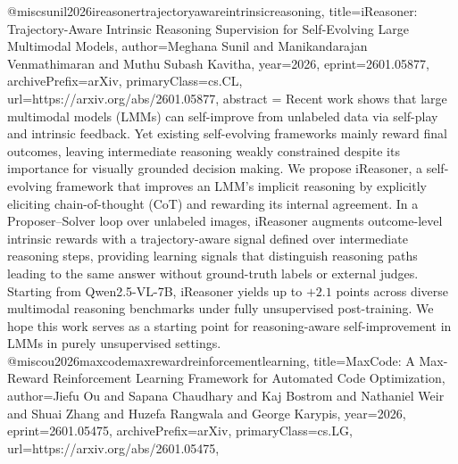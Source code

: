{}@misc{sunil2026ireasonertrajectoryawareintrinsicreasoning,
      title={iReasoner: Trajectory-Aware Intrinsic Reasoning Supervision for Self-Evolving Large Multimodal Models}, 
      author={Meghana Sunil and Manikandarajan Venmathimaran and Muthu Subash Kavitha},
      year={2026},
      eprint={2601.05877},
      archivePrefix={arXiv},
      primaryClass={cs.CL},
      url={https://arxiv.org/abs/2601.05877},
      abstract = {Recent work shows that large multimodal models (LMMs) can self-improve from unlabeled data via self-play and intrinsic feedback. Yet existing self-evolving frameworks mainly reward final outcomes, leaving intermediate reasoning weakly constrained despite its importance for visually grounded decision making. We propose iReasoner, a self-evolving framework that improves an LMM's implicit reasoning by explicitly eliciting chain-of-thought (CoT) and rewarding its internal agreement. In a Proposer--Solver loop over unlabeled images, iReasoner augments outcome-level intrinsic rewards with a trajectory-aware signal defined over intermediate reasoning steps, providing learning signals that distinguish reasoning paths leading to the same answer without ground-truth labels or external judges. Starting from Qwen2.5-VL-7B, iReasoner yields up to $+2.1$ points across diverse multimodal reasoning benchmarks under fully unsupervised post-training. We hope this work serves as a starting point for reasoning-aware self-improvement in LMMs in purely unsupervised settings.}
}@misc{ou2026maxcodemaxrewardreinforcementlearning,
      title={MaxCode: A Max-Reward Reinforcement Learning Framework for Automated Code Optimization}, 
      author={Jiefu Ou and Sapana Chaudhary and Kaj Bostrom and Nathaniel Weir and Shuai Zhang and Huzefa Rangwala and George Karypis},
      year={2026},
      eprint={2601.05475},
      archivePrefix={arXiv},
      primaryClass={cs.LG},
      url={https://arxiv.org/abs/2601.05475},
}
